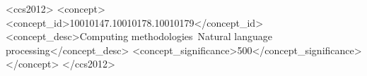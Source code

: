 \documentclass[acmsmall, screen]{acmart}
\begin{document}


\begin{CCSXML}
<ccs2012>
   <concept>
       <concept_id>10010147.10010178.10010179</concept_id>
       <concept_desc>Computing methodologies~Natural language processing</concept_desc>
       <concept_significance>500</concept_significance>
       </concept>
 </ccs2012>
\end{CCSXML}




\end{document}
